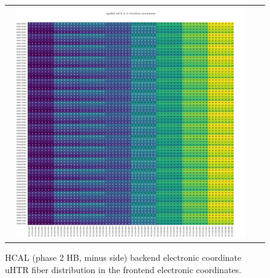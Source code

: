 \clearpage
\begin{figure}[htb]
 \begin{center}
  \begin{tabular}{cc}
   \includegraphics[angle=0,width=0.95\textwidth]{figures/appendix/ngHBM_uHTR_FI_in_FrontEnd.png}
  \end{tabular}
  \caption{HCAL (phase 2 HB, minus side) backend electronic coordinate uHTR fiber distribution in the frontend electronic coordinates.}
  \label{fig:lmapngHBMuHTRFIFEC}
 \end{center}
\end{figure}

